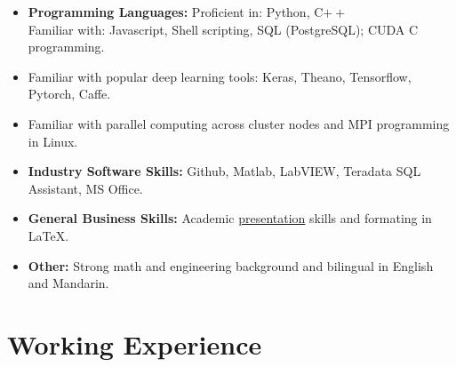 \documentclass[11pt,a4paper,sans]{moderncv}        %
\begin{document}
	\begin{itemize}
		
		\item \textbf{Programming Languages:} Proficient in: Python, C$++$ \\ Familiar with: Javascript, Shell scripting, SQL (PostgreSQL); CUDA C programming.
		
		\vspace{6pt}
		
		\item{Familiar with popular deep learning tools: Keras, Theano, Tensorflow, Pytorch, Caffe.}
		
		\vspace{6pt}
		
		\item{Familiar with parallel computing across cluster nodes and MPI programming in Linux.}
		
		\vspace{6pt}
		
		\item \textbf{Industry Software Skills:} Github, Matlab, LabVIEW, Teradata SQL Assistant, MS Office.	
		
		\vspace{6pt}
		
		\item \textbf{General Business Skills:} Academic \href{https://hma02.github.io/AllanMa/presentations.html}{presentation} skills and formating in \LaTeX.
		
		\vspace{6pt}
		
		\item \textbf{Other:} Strong math and engineering background and bilingual in English and Mandarin.
		
	\end{itemize}
	
	\vspace{2pt}
	
	\section{Working Experience}
	
	\vspace{6pt}
	
\end{document}
